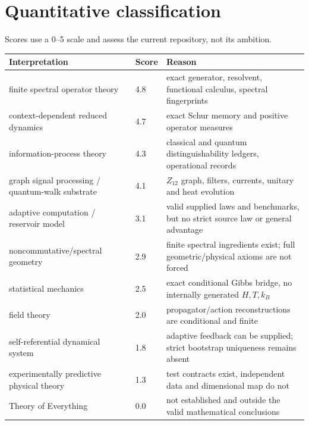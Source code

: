 \documentclass[11pt,a4paper,openany]{report}
\begin{document}
\section{Quantitative classification}

Scores use a 0--5 scale and assess the current repository, not its ambition.

\begin{center}
\begingroup\small
\setlength{\tabcolsep}{2.5pt}
\renewcommand{\arraystretch}{1.16}
\begin{longtable}{@{}p{}p{}p{}@{}}
\toprule
\textbf{Interpretation} & \textbf{Score} & \textbf{Reason} \\
\midrule
\endhead
finite spectral operator theory & 4.8 & exact generator, resolvent, functional calculus, spectral fingerprints \\
context-dependent reduced dynamics & 4.7 & exact Schur memory and positive operator measures \\
information-process theory & 4.3 & classical and quantum distinguishability ledgers, operational records \\
graph signal processing /\allowbreak{} quantum-walk substrate & 4.1 & \(Z_{12}\) graph, filters, currents, unitary and heat evolution \\
adaptive computation /\allowbreak{} reservoir model & 3.1 & valid supplied laws and benchmarks, but no strict source law or general advantage \\
noncommutative/\allowbreak{}spectral geometry & 2.9 & finite spectral ingredients exist; full geometric/\allowbreak{}physical axioms are not forced \\
statistical mechanics & 2.5 & exact conditional Gibbs bridge, no internally generated \(H,T,k_B\) \\
field theory & 2.0 & propagator/\allowbreak{}action reconstructions are conditional and finite \\
self-referential dynamical system & 1.8 & adaptive feedback can be supplied; strict bootstrap uniqueness remains absent \\
experimentally predictive physical theory & 1.3 & test contracts exist, independent data and dimensional map do not \\
Theory of Everything & 0.0 & not established and outside the valid mathematical conclusions \\
\bottomrule
\end{longtable}
\endgroup
\end{center}
\end{document}
